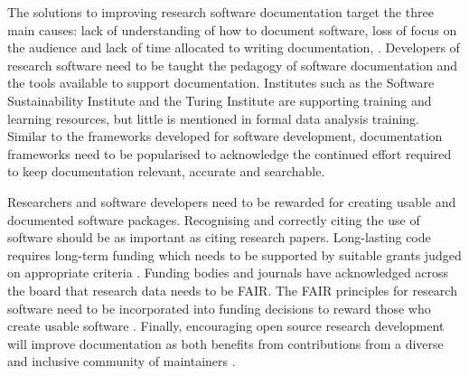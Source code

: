 \documentclass[../main.tex]{subfiles}
\begin{document}
The solutions to improving research software documentation target the three main causes: lack of understanding of how to document software, loss of focus on the audience and lack of time allocated to writing documentation, \parencite{Rios2020}. 
Developers of research software need to be taught the pedagogy of software documentation and the tools available to support documentation.
Institutes such as the Software Sustainability Institute and the Turing Institute are supporting training and learning resources, but little is mentioned in formal data analysis training. 
Similar to the frameworks developed for software development, documentation frameworks need to be popularised to acknowledge the continued effort required to keep documentation relevant, accurate and searchable.

Researchers and software developers need to be rewarded for creating usable and documented software packages.
Recognising and correctly citing the use of software should be as important as citing research papers.
Long-lasting code requires long-term funding which needs to be supported by suitable grants judged on appropriate criteria \parencite{Goble2014}.
Funding bodies and journals have acknowledged across the board that research data needs to be FAIR.
The FAIR principles for research software need to be incorporated into funding decisions to reward those who create usable software \parencite{Hong2022}.
Finally, encouraging open source research development will improve documentation as both benefits from contributions from a diverse and inclusive community of maintainers \parencite{Strasser2022}.
\newpage
\end{document}
